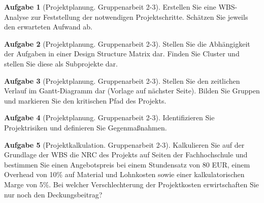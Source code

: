 \documentclass[10pt,a4paper,headsepline,smallheadings]{scrartcl}
\theoremstyle{definition}
\newtheorem{aufgabe}{Aufgabe}
\begin{document}
\begin{aufgabe}[Projektplanung. Gruppenarbeit 2-3] 
Erstellen Sie eine WBS-Analyse zur Feststellung der notwendigen Projektschritte. Sch\"atzen Sie jeweils den erwarteten Aufwand ab. 
\end{aufgabe}

\begin{aufgabe}[Projektplanung. Gruppenarbeit 2-3] 
Stellen Sie die Abh\"angigkeit der Aufgaben in einer Design Structure Matrix dar. Finden Sie Cluster und stellen Sie diese als Subprojekte dar.
\end{aufgabe}

\begin{aufgabe}[Projektplanung. Gruppenarbeit 2-3] 
Stellen Sie den zeitlichen Verlauf im Gantt-Diagramm dar (Vorlage auf n\"achster Seite). Bilden Sie Gruppen und markieren Sie den kritischen Pfad des Projekts.
\end{aufgabe}

\begin{aufgabe}[Projektplanung. Gruppenarbeit 2-3] 
Identifizieren Sie Projektrisiken und definieren Sie Gegenma{\ss}nahmen.
\end{aufgabe}

\begin{aufgabe}[Projektkalkulation. Gruppenarbeit 2-3] 
Kalkulieren Sie auf der Grundlage der WBS die NRC des Projekts auf Seiten der Fachhochschule und bestimmen Sie einen Angebotspreis bei einem Stundensatz von 80 EUR, einem Overhead von 10\% auf Material und Lohnkosten sowie einer kalkulatorischen Marge von 5\%. Bei welcher Verschlechterung der Projektkosten erwirtschaften Sie nur noch den Deckungsbeitrag?
\end{aufgabe}
\end{document}
